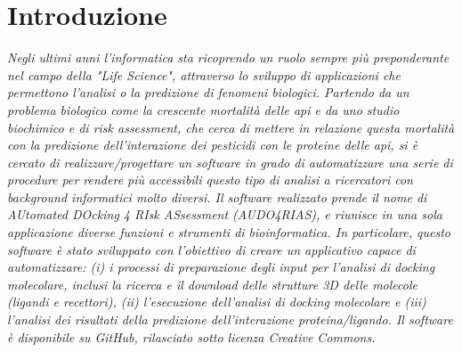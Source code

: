 \chapter*{\centering Introduzione}
\pagestyle{plain}
\begin{adjustwidth}{25pt}{25pt}
\fontsize{18pt}{14pt}\selectfont
\textit{Negli ultimi anni l'informatica sta ricoprendo un ruolo sempre più preponderante nel campo della "Life Science", attraverso lo sviluppo di applicazioni che permettono l’analisi o la predizione di fenomeni biologici. Partendo da un problema biologico come la crescente mortalità delle api e da uno studio biochimico e di risk assessment, che cerca di mettere in relazione questa mortalità con la predizione dell’interazione dei pesticidi con le proteine delle api, si è cercato di realizzare/progettare un software in grado di automatizzare una serie di procedure per rendere più accessibili questo tipo di analisi a ricercatori con background informatici molto diversi. Il software realizzato prende il nome di AUtomated DOcking 4 RIsk ASsessment (AUDO4RIAS), e riunisce in una sola applicazione diverse funzioni e strumenti di bioinformatica. In particolare, questo software è stato sviluppato con l’obiettivo di creare un applicativo capace di automatizzare: (i) i processi di preparazione degli input per l’analisi di docking molecolare, inclusi la ricerca e il download delle strutture 3D delle molecole (ligandi e recettori), (ii) l’esecuzione dell’analisi di docking molecolare e (iii) l’analisi dei risultati della predizione dell’interazione proteina/ligando. Il software è disponibile su GitHub, rilasciato sotto licenza Creative Commons.}
\end{adjustwidth}